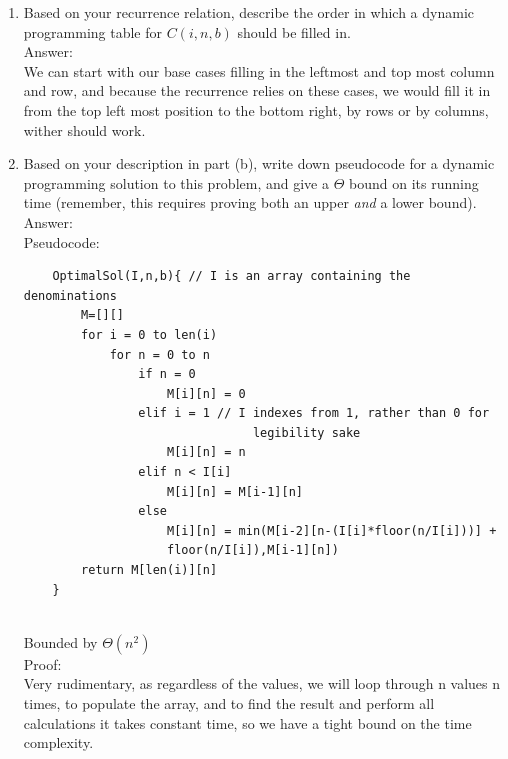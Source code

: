 \documentclass[12pt]{article}
\begin{document}
\begin{enumerate}
\begin{enumerate}
        \item 
        
        Based on your recurrence relation, describe the order in which a dynamic programming table for $C(i,n,b)$ should be filled in.\\
        
        Answer:\\
    
        We can start with our base cases filling in the leftmost and top most column and row, and because the recurrence relies on these cases, we would fill it in from the top left most position to the bottom right, by rows or by columns, wither should work.\\
        
        \item 
        
        Based on your description in part (b), write down pseudocode for a dynamic programming solution to this problem, and give a $\Theta$ bound on its running time (remember, this requires proving both an upper \emph{and} a lower bound).\\
        
        Answer:\\
    
        Pseudocode:\\
        \begin{verbatim}
    OptimalSol(I,n,b){ // I is an array containing the denominations
        M=[][]
        for i = 0 to len(i)
            for n = 0 to n
                if n = 0
                    M[i][n] = 0
                elif i = 1 // I indexes from 1, rather than 0 for 
                                legibility sake
                    M[i][n] = n
                elif n < I[i]
                    M[i][n] = M[i-1][n]
                else
                    M[i][n] = min(M[i-2][n-(I[i]*floor(n/I[i]))] +
                    floor(n/I[i]),M[i-1][n])
        return M[len(i)][n]
    }
        \end{verbatim}\\
        
        Bounded by $\Theta(n^2)$\\
        Proof:\\
        Very rudimentary, as regardless of the values, we will loop through n values n times, to populate the array, and to find the result and perform all calculations it takes constant time, so we have a tight bound on the time complexity.\\
        
    \end{enumerate}

\end{enumerate}
\end{document}
